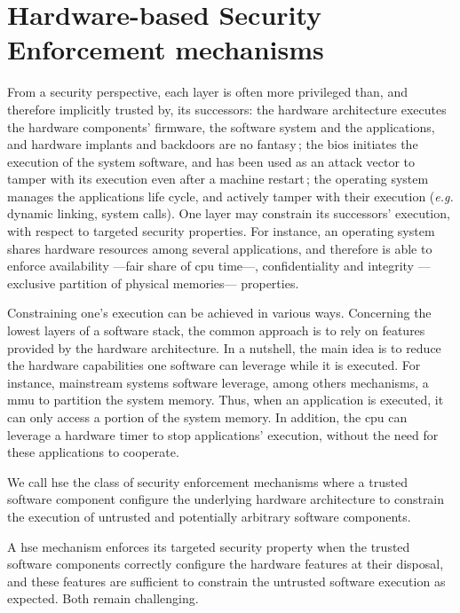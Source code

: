 \section{Hardware-based Security Enforcement mechanisms}

From a security perspective, each layer is often more privileged than, and
therefore implicitly trusted by, its successors:
%
the hardware architecture executes the hardware components' firmware, the
software system and the applications, and hardware implants and backdoors are no
fantasy\,\cite{yang2016a2};
%
the \ac{bios} initiates the execution of the system software, and has been used
as an attack vector to tamper with its execution even after a machine
restart\,\cite{embleton2013smm};
%
the operating system manages the applications life cycle, and actively tamper
with their execution (\emph{e.g.} dynamic linking, system calls).
%
One layer may constrain its successors' execution, with respect to targeted
security properties.
%
For instance, an operating system shares hardware resources among several
applications, and therefore is able to enforce availability ---fair share of
\ac{cpu} time---, confidentiality and integrity ---exclusive partition of
physical memories--- properties.

Constraining one's execution can be achieved in various ways.
%
Concerning the lowest layers of a software stack, the common approach is to rely
on features provided by the hardware architecture.
%
In a nutshell, the main idea is to reduce the hardware capabilities one software
can leverage while it is executed.
%
For instance, mainstream systems software leverage, among others mechanisms, a
\ac{mmu} to partition the system memory.
%
Thus, when an application is executed, it can only access a portion of the
system memory.
%
In addition, the \ac{cpu} can leverage a hardware timer to stop applications'
execution, without the need for these applications to cooperate.

\begin{definition}
  We call \ac{hse} the class of security enforcement mechanisms where a trusted
  software component configure the underlying hardware architecture to constrain
  the execution of untrusted and potentially arbitrary software components.
\end{definition}

A \ac{hse} mechanism enforces its targeted security property when the trusted
software components correctly configure the hardware features at their disposal,
and these features are sufficient to constrain the untrusted software execution
as expected.
%
Both remain challenging.

